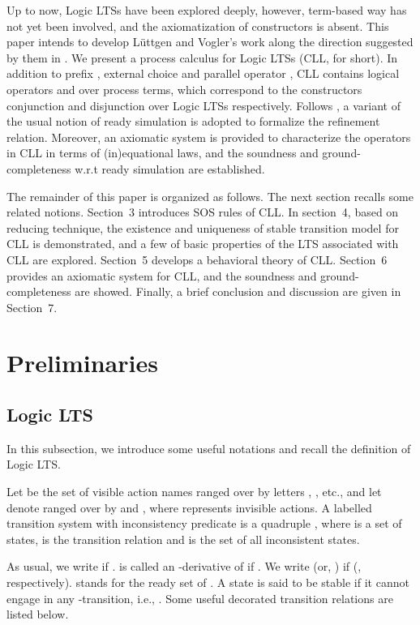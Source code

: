 \documentclass{elsarticle}
\theoremstyle{plain}
\theoremstyle{definition}
\begin{document}
    Up to now, Logic LTSs have been explored deeply, however, term-based way has not yet been involved, and the axiomatization of constructors is absent.
    This paper intends to develop L\"{u}ttgen and Vogler's work along the direction suggested by them in \cite{Luttgen10}.
    We present a process calculus for Logic LTSs (CLL, for short). In addition to prefix , external choice  and parallel operator , CLL contains logical operators  and  over process terms, which correspond to the constructors conjunction and disjunction over Logic LTSs respectively.
    Follows \cite{Luttgen10}, a variant of the usual notion of ready simulation is adopted to formalize the refinement relation.
    Moreover, an axiomatic system  is provided to characterize the operators in CLL in terms of (in)equational laws, and the soundness and ground-completeness w.r.t ready simulation are established.


    The remainder of this paper is organized as follows. The next section recalls some related notions.
    Section~3 introduces SOS rules of CLL.
    In section~4, based on reducing technique, the existence and uniqueness of stable transition model for CLL is demonstrated, and a few of  basic properties of the LTS associated with CLL are explored.
    Section~5  develops a behavioral theory of CLL.
    Section~6 provides an axiomatic system for CLL, and the soundness and ground-completeness are showed.
    Finally, a brief conclusion and discussion are given in Section~7.

\section{Preliminaries}

\subsection{Logic LTS}

In this subsection, we introduce some useful notations and recall the definition of Logic LTS.

Let  be the set of visible action names ranged over by letters , , etc., and let  denote  ranged over by  and , where  represents invisible actions.
A labelled transition system with inconsistency predicate is a quadruple , where  is a set of states,  is the transition relation and  is the set of all inconsistent states.

As usual, we write  if .
 is called an -derivative of  if .
We write  (or, ) if  (, respectively).
 stands for the ready set  of .
A state  is said to be stable if it cannot engage in any -transition, i.e., .
Some useful decorated transition relations are listed below.
\end{document}
